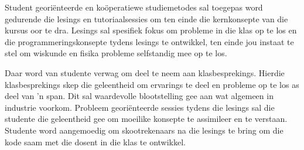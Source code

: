     Student geori\"{e}nteerde en ko\"{o}peratiewe studiemetodes sal
    toegepas word gedurende die lesings en tutoriaalsessies om ten
    einde die kernkonsepte van die kursus oor te dra.  Lesings sal
    spesifiek fokus om probleme in die klas op te los en die
    programmeringskonsepte tydens lesings te ontwikkel, ten einde jou
    instaat te stel om wiskunde en fisika probleme selfstandig mee op
    te los.

    Daar word van studente verwag om deel te neem aan
    klasbesprekings. Hierdie klasbesprekings skep die geleentheid om
    ervarings te deel en probleme op te los as deel van 'n span.  Dit
    sal waardevolle blootstelling gee aan wat algemeen in industrie
    voorkom. Probleem geori\"{e}nteerde sessies tydens die lesings sal
    die studente die geleentheid gee om moeilike konsepte te
    assimileer en te verstaan. Studente word aangemoedig om
    skootrekenaars na die lesings te bring om die kode saam met die
    dosent in die klas te ontwikkel.




    